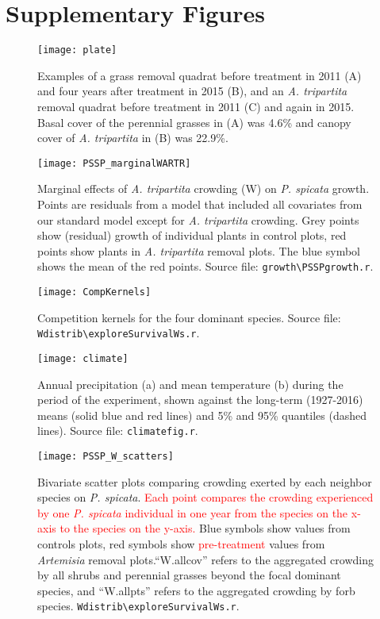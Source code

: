 \documentclass[11pt]{article}
\newcommand{\new}{\textcolor{red}}
\begin{document}
\section{Supplementary Figures} 

 \begin{figure}[h]
 \centering
 \texttt{[image: plate]}
 \caption{Examples of a grass removal quadrat before treatment in 2011 (A) and four years after treatment in 2015 (B), and an \textit{A. tripartita} removal quadrat before treatment in 2011 (C) and again in 2015. Basal cover of the perennial grasses in (A) was 4.6\% and canopy cover of  \textit{A. tripartita} in (B) was 22.9\%. }
 \label{fig:photos}
 \end{figure}


 \begin{figure}[h]
 \centering
 \texttt{[image: PSSP\_marginalWARTR]}
 \caption{Marginal effects of \textit{A. tripartita} crowding (W) on \textit{P. spicata} growth. Points are residuals from a model that included all 
 covariates from our standard model except for \textit{A. tripartita} crowding. Grey points show (residual) growth of individual plants in control plots, red points show plants in \textit{A. tripartita} removal plots. The blue symbol shows the mean of the red points. Source file: \texttt{growth\textbackslash PSSPgrowth.r}. }
 \label{fig:PSSPresids}
 \end{figure}

 \begin{figure}[h]
 \centering
 \texttt{[image: CompKernels]}
 \caption{Competition kernels for the four dominant species. Source file: \texttt{Wdistrib\textbackslash exploreSurvivalWs.r}. }
 \label{fig:CompKernels}
 \end{figure}
 
  \begin{figure}[h]
  \centering
  \texttt{[image: climate]}
  \caption{Annual precipitation (a) and mean temperature (b) during the period of the experiment, shown against the long-term (1927-2016) means (solid blue and red lines) and 5\% and 95\% quantiles (dashed lines). Source file:  \texttt{climate\textunderscore fig.r}.}
  \label{fig:climate}
  \end{figure}
  
 
  \begin{figure}[tbp]
  \centering
  \texttt{[image: PSSP\_W\_scatters]}
  \caption{Bivariate scatter plots comparing crowding exerted by each neighbor species on \textit{P. spicata}. \new{Each point compares the crowding experienced by one \textit{P. spicata} individual in one year from the species on the x-axis to the species on the y-axis.}   Blue symbols show values from controls plots, red symbols show \new{pre-treatment} values from \textit{Artemisia} removal plots.``W.allcov'' refers to the aggregated crowding by all shrubs and perennial grasses beyond the focal dominant species, and ``W.allpts'' refers to the aggregated crowding by forb species.  \texttt{Wdistrib\textbackslash exploreSurvivalWs.r}. }
  \label{fig:Wscatters}
  \end{figure}
  
\end{document}
